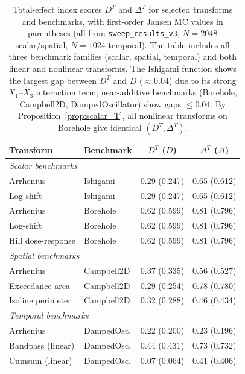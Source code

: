 \documentclass[11pt,onecolumn]{article}
\begin{document}
\begin{table}[H]
\centering
\caption{Total-effect index scores $D^T$ and $\Delta^T$ for selected
transforms and benchmarks, with first-order Jansen MC values in parentheses
(all from \texttt{sweep\_results\_v3}, $N=2048$ scalar/spatial, $N=1024$ temporal).
The table includes all three benchmark families (scalar, spatial, temporal)
and both linear and nonlinear transforms.  The Ishigami function shows
the largest gap between $D^T$ and $D$ ($\approx 0.04$) due to its strong
$X_1$--$X_3$ interaction term; near-additive benchmarks (Borehole, Campbell2D,
DampedOscillator) show gaps $\leq 0.04$.  By Proposition~\ref{prop:scalar_T},
all nonlinear transforms on Borehole give identical $(D^T,\Delta^T)$.}
\label{tab:total_effects}
\small
\begin{tabular}{llcc}
\toprule
Transform & Benchmark & $D^T$ ($D$) & $\Delta^T$ ($\Delta$) \\
\midrule
\multicolumn{4}{l}{\textit{Scalar benchmarks}} \\
Arrhenius            & Ishigami     & 0.29 (0.247) & 0.65 (0.612) \\
Log-shift            & Ishigami     & 0.29 (0.247) & 0.65 (0.612) \\
Arrhenius            & Borehole     & 0.62 (0.599) & 0.81 (0.796) \\
Log-shift            & Borehole     & 0.62 (0.599) & 0.81 (0.796) \\
Hill dose-response   & Borehole     & 0.62 (0.599) & 0.81 (0.796) \\
\midrule
\multicolumn{4}{l}{\textit{Spatial benchmarks}} \\
Arrhenius            & Campbell2D   & 0.37 (0.335) & 0.56 (0.527) \\
Exceedance area      & Campbell2D   & 0.29 (0.254) & 0.78 (0.780) \\
Isoline perimeter    & Campbell2D   & 0.32 (0.288) & 0.46 (0.434) \\
\midrule
\multicolumn{4}{l}{\textit{Temporal benchmarks}} \\
Arrhenius            & DampedOsc.   & 0.22 (0.200) & 0.23 (0.196) \\
Bandpass (linear)    & DampedOsc.   & 0.44 (0.431) & 0.73 (0.732) \\
Cumsum (linear)      & DampedOsc.   & 0.07 (0.064) & 0.41 (0.406) \\
\bottomrule
\end{tabular}
\end{table}
\end{document}
